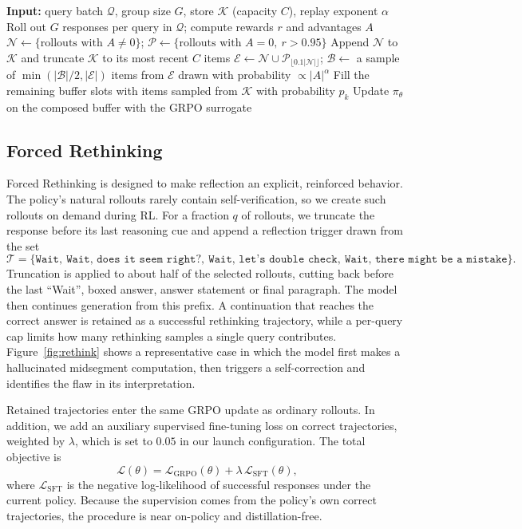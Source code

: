 \documentclass{article}
\begin{document}
\begin{algorithm}[t]
\caption{Selective Sample Replay (one training iteration)}
\label{alg:ssr}
\begin{algorithmic}[1]
\State \textbf{Input:} query batch $\mathcal{Q}$, group size $G$, store $\mathcal{K}$ (capacity $C$), replay exponent $\alpha$
\State Roll out $G$ responses per query in $\mathcal{Q}$; compute rewards $r$ and advantages $A$
\State $\mathcal{N} \gets \{\text{rollouts with } A\neq 0\}$; $\mathcal{P} \gets \{\text{rollouts with } A=0,\ r > 0.95\}$
\State Append $\mathcal{N}$ to $\mathcal{K}$ and truncate $\mathcal{K}$ to its most recent $C$ items
\State $\mathcal{E} \gets \mathcal{N} \cup \mathcal{P}_{\lfloor 0.1|\mathcal{N}|\rfloor}$; $\mathcal{B} \gets$ a sample of $\min(|\mathcal{B}|/2, |\mathcal{E}|)$ items from $\mathcal{E}$ drawn with probability $\propto |A|^{\alpha}$
\State Fill the remaining buffer slots with items sampled from $\mathcal{K}$ with probability $p_k$
\State Update $\pi_\theta$ on the composed buffer with the GRPO surrogate
\end{algorithmic}
\end{algorithm}

\subsection{Forced Rethinking}

Forced Rethinking is designed to make reflection an explicit, reinforced behavior. The policy's natural rollouts rarely contain self-verification, so we create such rollouts on demand during RL. For a fraction $q$ of rollouts, we truncate the response before its last reasoning cue and append a reflection trigger drawn from the set
\[
\mathcal{T} = \{\texttt{Wait},\ \texttt{Wait, does it seem right?},\ \texttt{Wait, let's double check},\ \texttt{Wait, there might be a mistake}\}.
\]
Truncation is applied to about half of the selected rollouts, cutting back before the last ``Wait'', boxed answer, answer statement or final paragraph. The model then continues generation from this prefix. A continuation that reaches the correct answer is retained as a successful rethinking trajectory, while a per-query cap limits how many rethinking samples a single query contributes. Figure~\ref{fig:rethink} shows a representative case in which the model first makes a hallucinated midsegment computation, then triggers a self-correction and identifies the flaw in its interpretation.

Retained trajectories enter the same GRPO update as ordinary rollouts. In addition, we add an auxiliary supervised fine-tuning loss on correct trajectories, weighted by $\lambda$, which is set to $0.05$ in our launch configuration. The total objective is
\begin{equation}
    \mathcal{L}(\theta) = \mathcal{L}_{\text{GRPO}}(\theta) + \lambda\,\mathcal{L}_{\text{SFT}}(\theta),
\end{equation}
where $\mathcal{L}_{\text{SFT}}$ is the negative log-likelihood of successful responses under the current policy. Because the supervision comes from the policy's own correct trajectories, the procedure is near on-policy and distillation-free.
\end{document}
